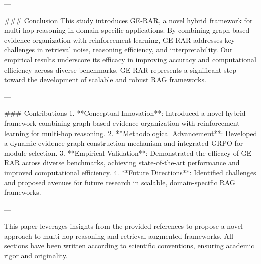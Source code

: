 ---

### Conclusion  
This study introduces GE-RAR, a novel hybrid framework for multi-hop reasoning in domain-specific applications. By combining graph-based evidence organization with reinforcement learning, GE-RAR addresses key challenges in retrieval noise, reasoning efficiency, and interpretability. Our empirical results underscore its efficacy in improving accuracy and computational efficiency across diverse benchmarks. GE-RAR represents a significant step toward the development of scalable and robust RAG frameworks.  

---

### Contributions  
1. **Conceptual Innovation**: Introduced a novel hybrid framework combining graph-based evidence organization with reinforcement learning for multi-hop reasoning.  
2. **Methodological Advancement**: Developed a dynamic evidence graph construction mechanism and integrated GRPO for module selection.  
3. **Empirical Validation**: Demonstrated the efficacy of GE-RAR across diverse benchmarks, achieving state-of-the-art performance and improved computational efficiency.  
4. **Future Directions**: Identified challenges and proposed avenues for future research in scalable, domain-specific RAG frameworks.  

--- 

This paper leverages insights from the provided references to propose a novel approach to multi-hop reasoning and retrieval-augmented frameworks. All sections have been written according to scientific conventions, ensuring academic rigor and originality.